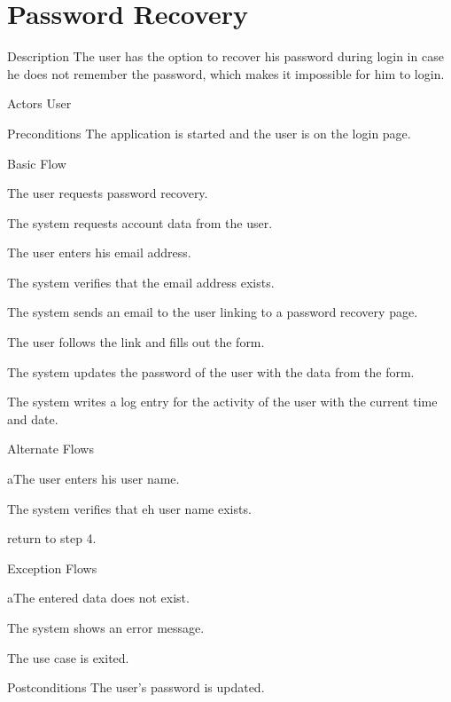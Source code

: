 \section{Password Recovery}

%
\begin{cpart}{Description}
The user has the option to recover his password during login in case he does not remember the password, which makes it impossible for him to login.
\end{cpart}


%
\begin{cpart}{Actors}
User
\end{cpart}

%
\begin{cpart}{Preconditions}
The application is started and the user is on the login page.
\end{cpart}

%
\begin{cpartList}{Basic Flow}
  \item The user requests password recovery.
  \item The system requests account data from the user.
  \item The user enters his email address.
  \item The system verifies that the email address exists.
  \item The system sends an email to the user linking to a password recovery page.
  \item The user follows the link and fills out the form.
  \item The system updates the password of the user with the data from the form.
  \item The system writes a log entry for the activity of the user with the current time and date.
\end{cpartList}

%
\begin{cpartList}{Alternate Flows}
  \begin{innerList}{3}{a}{The user enters his user name.}
    \item The system verifies that eh user name exists.
    \item return to step 4.
  \end{innerList}
\end{cpartList}

%
\begin{cpartList}{Exception Flows}
  \begin{innerList}{4}{a}{The entered data does not exist.}
    \item The system shows an error message.
    \item The use case is exited.
  \end{innerList}
\end{cpartList}

%
\begin{cpart}{Postconditions}
The user's password is updated.
\end{cpart}

